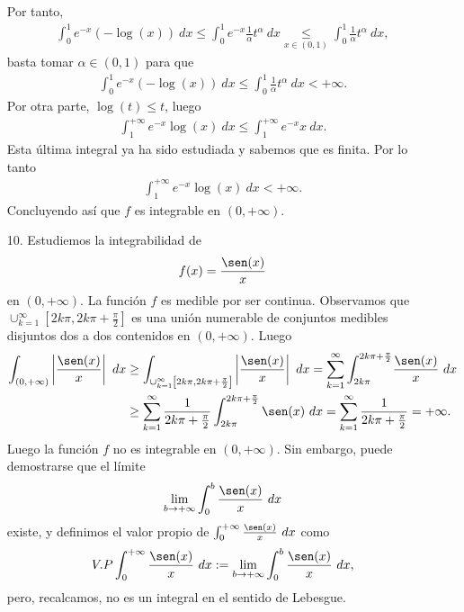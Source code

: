 \begin{ejemplo}
\begin{enumerate}
    Por tanto, 
    \begin{align*}
       \int_{0}^{1}{e^{-x}(-\log(x)) \ dx} \leq \int_{0}^{1}{e^{-x}\frac{1}{\alpha}t^{\alpha}\ dx} \underset{x \in (0,1)}{\leq} \int_{0}^{1}{\frac{1}{\alpha}t^{\alpha}\ dx},
    \end{align*}
    basta tomar $\alpha \in (0,1)$ para que
    \begin{align*}
        \int_{0}^{1}{e^{-x}(-\log(x)) \ dx} \leq \int_{0}^{1}{\frac{1}{\alpha}t^{\alpha}\ dx} < +\infty.
    \end{align*}
    Por otra parte, $\log(t) \leq t$, luego
    \begin{align*}
        \int_{1}^{+\infty}{e^{-x}\log(x) \ dx} \leq \int_{1}^{+\infty}{e^{-x}x \ dx}.
    \end{align*}
    Esta última integral ya ha sido estudiada y sabemos que es finita. Por lo tanto
    \begin{align*}
        \int_{1}^{+\infty}{e^{-x}\log(x) \ dx} < +\infty.
    \end{align*}
    Concluyendo así que $f$ es integrable en $(0,+\infty)$.
    \item[10.] Estudiemos la integrabilidad de
    \begin{align*}
        f(x) = \frac{\sen(x)}{x}
    \end{align*}
    en $(0,+\infty)$. La función $f$ es medible por ser continua. Observamos que $\cup_{k=1}^{\infty}{\left[2k\pi, 2k\pi + \frac{\pi}{2}\right]}$ es una unión numerable de conjuntos medibles disjuntos dos a dos contenidos en $(0,+\infty)$. Luego
    \begin{align*}
        \int_{(0,+\infty)}{\left| \frac{\sen(x)}{x}\right| \ dx} &\ge \int_{\cup_{k=1}^{\infty}{\left[2k\pi, 2k\pi + \frac{\pi}{2}\right]}}{\left| \frac{\sen(x)}{x}\right| \ dx} = \sum_{k=1}^{\infty}{\int_{2k\pi}^{2k\pi + \frac{\pi}{2}}}{\frac{\sen(x)}{x} \ dx}\\
        &\ge \sum_{k=1}^{\infty}{\frac{1}{2k\pi + \frac{\pi}{2}}\int_{2k\pi}^{2k\pi + \frac{\pi}{2}}{\sen(x) \ dx}} = \sum_{k=1}^{\infty}{\frac{1}{2k\pi + \frac{\pi}{2}}} = +\infty.
    \end{align*}
    Luego la función $f$ no es integrable en $(0,+\infty)$. Sin embargo, puede demostrarse que el límite
    \begin{align*}
        \lim_{b \to +\infty}{\int_{0}^{b}{\frac{\sen(x)}{x}} \ dx}
    \end{align*}
    existe, y definimos el valor propio de $\int_{0}^{+\infty}{\frac{\sen(x)}{x} \ dx}$ como
    \begin{align*}
        V.P\int_{0}^{+\infty}{\frac{\sen(x)}{x} \ dx} := \lim_{b \to +\infty}{\int_{0}^{b}{\frac{\sen(x)}{x}} \ dx}, 
    \end{align*}
    pero, recalcamos, no es un integral en el sentido de Lebesgue.
\end{enumerate}
\end{ejemplo}

